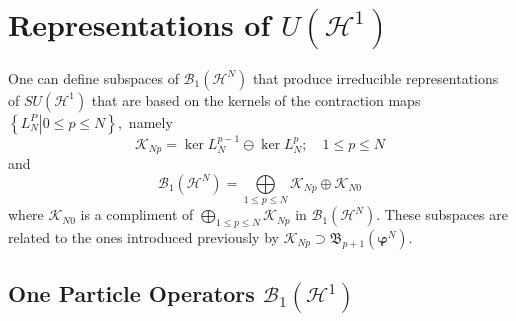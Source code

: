 \documentclass[aps,preprint]{revtex4}%
\begin{document}
\section{Representations of $U\left(  \mathcal{H}^{1}\right)  $}

One can define subspaces of $\mathcal{B}_{1}\left(  \mathcal{H}^{N}\right)  $
that produce irreducible representations of $SU\left(  \mathcal{H}^{1}\right)
$ that are based on the kernels of the contraction maps $\left\{  \left.
L_{N}^{P}\right\vert 0\leq p\leq N\right\}  ,$ namely
\begin{equation}
\mathcal{K}_{Np}=\ker L_{N}^{p-1}\ominus\ker L_{N}^{p};\quad1\leq p\leq N
\end{equation}
and
\begin{equation}
\mathcal{B}_{1}\left(  \mathcal{H}^{N}\right)  =%
{\textstyle\bigoplus\limits_{1\leq p\leq N}}
\mathcal{K}_{Np}\oplus\mathcal{K}_{N0}%
\end{equation}
where $\mathcal{K}_{N0}$ is a compliment of $%
{\textstyle\bigoplus\limits_{1\leq p\leq N}}
\mathcal{K}_{Np}$ in $\mathcal{B}_{1}\left(  \mathcal{H}^{N}\right)  $. These
subspaces are related to the ones introduced previously by $\mathcal{K}%
_{Np}\supset\mathfrak{B}_{p+1}\left(  \mathbf{\varphi}^{N}\right)  $.

\subsection{One Particle Operators $\mathcal{B}_{1}\left(  \mathcal{H}%
^{1}\right)  $}
\end{document}
